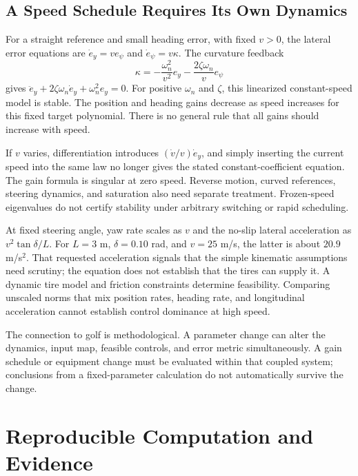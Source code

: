 \subsection{A Speed Schedule Requires Its Own Dynamics}

For a straight reference and small heading error, with fixed $v>0$, the lateral error equations are $\dot e_y=v e_\psi$ and $\dot e_\psi=v\kappa$. The curvature feedback
\begin{equation}
 \kappa=-\frac{\omega_n^2}{v^2}e_y-\frac{2\zeta\omega_n}{v}e_\psi
\end{equation}
gives $\ddot e_y+2\zeta\omega_n\dot e_y+\omega_n^2e_y=0$. For positive $\omega_n$ and $\zeta$, this linearized constant-speed model is stable. The position and heading gains decrease as speed increases for this fixed target polynomial. There is no general rule that all gains should increase with speed.

If $v$ varies, differentiation introduces $(\dot v/v)\dot e_y$, and simply inserting the current speed into the same law no longer gives the stated constant-coefficient equation. The gain formula is singular at zero speed. Reverse motion, curved references, steering dynamics, and saturation also need separate treatment. Frozen-speed eigenvalues do not certify stability under arbitrary switching or rapid scheduling.

At fixed steering angle, yaw rate scales as $v$ and the no-slip lateral acceleration as $v^2\tan\delta/L$. For $L=3$ m, $\delta=0.10$ rad, and $v=25$ m/s, the latter is about $20.9$ m/s$^2$. That requested acceleration signals that the simple kinematic assumptions need scrutiny; the equation does not establish that the tires can supply it. A dynamic tire model and friction constraints determine feasibility. Comparing unscaled norms that mix position rates, heading rate, and longitudinal acceleration cannot establish control dominance at high speed.

The connection to golf is methodological. A parameter change can alter the dynamics, input map, feasible controls, and error metric simultaneously. A gain schedule or equipment change must be evaluated within that coupled system; conclusions from a fixed-parameter calculation do not automatically survive the change.

\section{Reproducible Computation and Evidence}

